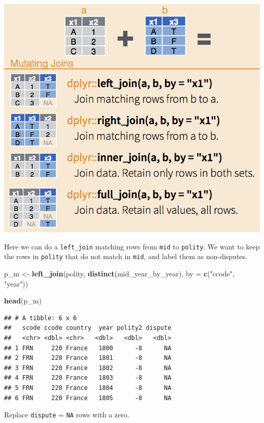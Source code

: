\documentclass[
]{book}
\newenvironment{Shaded}{\begin{snugshade}}{\end{snugshade}}
\newcommand{\DataTypeTok}[1]{\textcolor[rgb]{0.13,0.29,0.53}{#1}}
\newcommand{\KeywordTok}[1]{\textcolor[rgb]{0.13,0.29,0.53}{\textbf{#1}}}
\newcommand{\NormalTok}[1]{#1}
\newcommand{\StringTok}[1]{\textcolor[rgb]{0.31,0.60,0.02}{#1}}
\theoremstyle{definition}
\theoremstyle{definition}
\theoremstyle{definition}
\theoremstyle{remark}
\begin{document}
\includegraphics{images/dplyr-joins.png}

Here we can do a \texttt{left\_join} matching rows from \texttt{mid} to \texttt{polity}. We want to keep the rows in \texttt{polity} that do not match in \texttt{mid}, and label them as non-disputes.

\begin{Shaded}
\begin{Highlighting}[]
\NormalTok{p\_m <{-}}\StringTok{ }\KeywordTok{left\_join}\NormalTok{(polity,}
                 \KeywordTok{distinct}\NormalTok{(mid\_year\_by\_year),}
                 \DataTypeTok{by =} \KeywordTok{c}\NormalTok{(}\StringTok{"ccode"}\NormalTok{, }\StringTok{"year"}\NormalTok{))}

\KeywordTok{head}\NormalTok{(p\_m)}
\end{Highlighting}
\end{Shaded}

\begin{verbatim}
## # A tibble: 6 x 6
##   scode ccode country  year polity2 dispute
##   <chr> <dbl> <chr>   <dbl>   <dbl>   <dbl>
## 1 FRN     220 France   1800      -8      NA
## 2 FRN     220 France   1801      -8      NA
## 3 FRN     220 France   1802      -8      NA
## 4 FRN     220 France   1803      -8      NA
## 5 FRN     220 France   1804      -8      NA
## 6 FRN     220 France   1805      -8      NA
\end{verbatim}

Replace \texttt{dispute} = \texttt{NA} rows with a zero.
\end{document}
